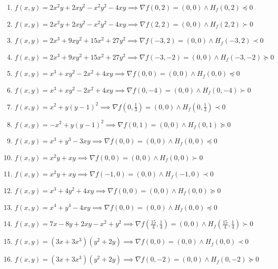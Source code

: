 \documentclass[11pt,a4paper]{article}
\begin{document}
\begin{enumerate}
\item $\displaystyle f(x, y) = 2x^{2} y + 2x y^{2} - x^{2} y^{2} - 4xy \implies \nabla f(0, 2) = (0, 0) \land H_{f}(0, 2) \preceq 0$
\item $\displaystyle f(x, y) = 2x^{2} y + 2x y^{2} - x^{2} y^{2} - 4xy \implies \nabla f(2, 2) = (0, 0) \land H_{f}(2, 2) \succ 0$
\item $\displaystyle f(x, y) = 2x^{3} + 9x y^{2} + 15x^{2} + 27y^{2} \implies \nabla f(-3, 2) = (0, 0) \land H_{f}(-3, 2) \prec 0$
\item $\displaystyle f(x, y) = 2x^{3} + 9x y^{2} + 15x^{2} + 27y^{2} \implies \nabla f(-3, -2) = (0, 0) \land H_{f}(-3, -2) \succeq 0$
\item $\displaystyle f(x, y) = x^{3} + x y^{2} - 2x^{2} + 4xy \implies \nabla f(0, 0) = (0, 0) \land H_{f}(0, 0) \preceq 0$
\item $\displaystyle f(x, y) = x^{3} + x y^{2} - 2x^{2} + 4xy \implies \nabla f(0, -4) = (0, 0) \land H_{f}(0, -4) \succ 0$
\item $\displaystyle f(x, y) = x^{2} + y(y - 1)^{2} \implies \nabla f\left( 0, \frac{1}{3} \right) = (0, 0) \land H_{f}\left( 0, \frac{1}{3} \right) \prec 0$
\item $\displaystyle f(x, y) = -x^{2} + y(y - 1)^{2} \implies \nabla f(0, 1) = (0, 0) \land H_{f}(0, 1) \succeq 0$
\item $\displaystyle f(x, y) = x^{3} + y^{3} - 3xy \implies \nabla f(0, 0) = (0, 0) \land H_{f}(0, 0) \preceq 0$
\item $\displaystyle f(x, y) = x^{2} y + xy \implies \nabla f(0, 0) = (0, 0) \land H_{f}(0, 0) \succ 0$
\item $\displaystyle f(x, y) = x^{2} y + xy \implies \nabla f(-1, 0) = (0, 0) \land H_{f}(-1, 0) \prec 0$
\item $\displaystyle f(x, y) = x^{3} + 4y^{2} + 4xy \implies \nabla f(0, 0) = (0, 0) \land H_{f}(0, 0) \succeq 0$
\item $\displaystyle f(x, y) = x^{4} + y^{4} - 4xy \implies \nabla f(0, 0) = (0, 0) \land H_{f}(0, 0) \preceq 0$
\item $\displaystyle f(x, y) = 7x - 8y + 2xy - x^{2} + y^{2} \implies \nabla f\left( \frac{15}{4}, \frac{1}{4} \right) = (0, 0) \land H_{f}\left( \frac{15}{4}, \frac{1}{4} \right) \succ 0$
\item $\displaystyle f(x, y) = (3x + 3x^{3})(y^{2} + 2y) \implies \nabla f(0, 0) = (0, 0) \land H_{f}(0, 0) \prec 0$
\item $\displaystyle f(x, y) = (3x + 3x^{3})(y^{2} + 2y) \implies \nabla f(0, -2) = (0, 0) \land H_{f}(0, -2) \succeq 0$

\end{enumerate}
\end{document}
